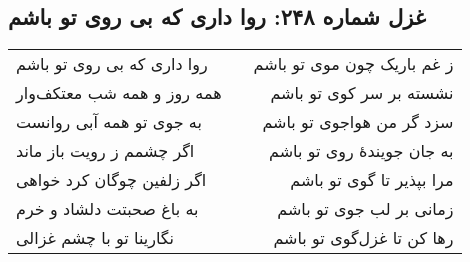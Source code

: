 \begin{center}
\section*{غزل شماره ۲۴۸: روا داری که بی روی تو باشم}
\label{sec:248}
\begin{longtable}{l p{0.5cm} r}
روا داری که بی روی تو باشم
&&
ز غم باریک چون موی تو باشم
\\
همه روز و همه شب معتکف‌وار
&&
نشسته بر سر کوی تو باشم
\\
به جوی تو همه آبی روانست
&&
سزد گر من هواجوی تو باشم
\\
اگر چشمم ز رویت باز ماند
&&
به جان جویندهٔ روی تو باشم
\\
اگر زلفین چوگان کرد خواهی
&&
مرا بپذیر تا گوی تو باشم
\\
به باغ صحبتت دلشاد و خرم
&&
زمانی بر لب جوی تو باشم
\\
نگارینا تو با چشم غزالی
&&
رها کن تا غزل‌گوی تو باشم
\\
\end{longtable}
\end{center}
